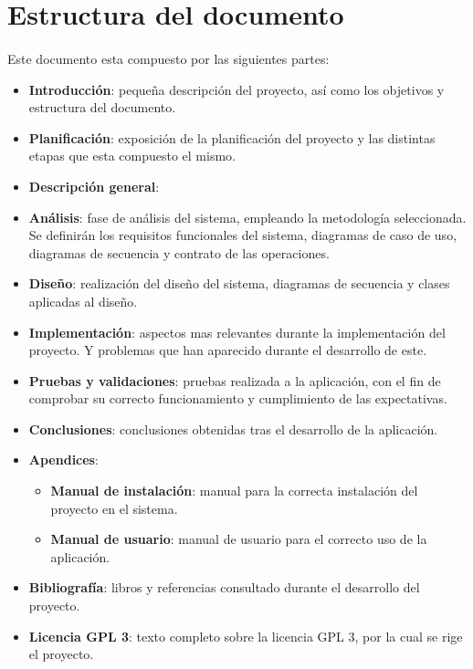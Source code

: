 \section{Estructura del documento}

\paragraph{}
Este documento esta compuesto por las siguientes partes:

\begin{itemize}
    \item \textbf{Introducción}: pequeña descripción del proyecto, así como los objetivos y estructura del documento.
    
    \item \textbf{Planificación}: exposición de la planificación del proyecto y las distintas etapas que esta compuesto el mismo.
    
    \item \textbf{Descripción general}: 
    
    \item \textbf{Análisis}: fase de análisis del sistema, empleando la metodología seleccionada. Se definirán los
    requisitos funcionales del sistema, diagramas de caso de uso, diagramas de secuencia y contrato de las operaciones.

    \item \textbf{Diseño}: realización del diseño del sistema, diagramas de secuencia y clases aplicadas al diseño.
    
    \item \textbf{Implementación}: aspectos mas relevantes durante la implementación del proyecto. Y problemas que han aparecido 
    durante el desarrollo de este.
    
    \item \textbf{Pruebas y validaciones}: pruebas realizada a la aplicación, con el fin de comprobar su correcto funcionamiento y
    cumplimiento de las expectativas.
    
    \item \textbf{Conclusiones}: conclusiones obtenidas tras el desarrollo de la aplicación.
    
    \item \textbf{Apendices}: 
    \begin{itemize}
        \item \textbf{Manual de instalación}: manual para la correcta instalación del proyecto en el sistema.
        \item \textbf{Manual de usuario}: manual de usuario para el correcto uso de la aplicación.
    \end{itemize}
    
    \item \textbf{Bibliografía}: libros y referencias consultado durante el desarrollo del proyecto.
    
    \item \textbf{Licencia GPL 3}: texto completo sobre la licencia GPL 3, por la cual se rige el proyecto.

\end{itemize}
